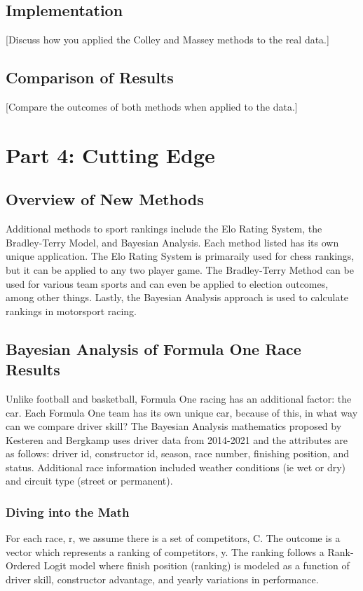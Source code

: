 \documentclass[12pt]{article}
\begin{document}
\subsection{Implementation}
[Discuss how you applied the Colley and Massey methods to the real data.]

\subsection{Comparison of Results}
[Compare the outcomes of both methods when applied to the data.]

\section{Part 4: Cutting Edge}
\subsection{Overview of New Methods}
Additional methods to sport rankings include the Elo Rating System, the Bradley-Terry Model,
and Bayesian Analysis. Each method listed has its own unique application. The Elo Rating System 
is primaraily used for chess rankings, but it can be applied to any two player game. 
The Bradley-Terry Method can be used for various team sports and can even be applied to 
election outcomes, among other things. Lastly, the Bayesian Analysis approach is used 
to calculate rankings in motorsport racing.

\subsection{Bayesian Analysis of Formula One Race Results}
Unlike football and basketball, Formula One racing has an additional factor: the car.
Each Formula One team has its own unique car, because of this, in what way can we compare
driver skill? The Bayesian Analysis mathematics proposed by Kesteren and Bergkamp uses driver data 
from 2014-2021 and the attributes are as follows: driver id, constructor id, season, race number, 
finishing position, and status. Additional race information included weather conditions (ie wet 
or dry) and circuit type (street or permanent).

\subsubsection{Diving into the Math}
For each race, r, we assume there is a set of competitors, C. The outcome is a vector which 
represents a ranking of competitors, y. The ranking follows a Rank-Ordered Logit model where 
finish position (ranking) is modeled as a function of driver skill, constructor advantage, and 
yearly variations in performance.
\end{document}
